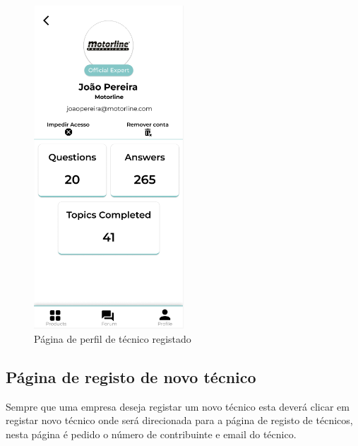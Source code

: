 \begin{figure}[htb]
    \centering
    \includegraphics[width=0.5\textwidth]{images/mockups/professional_profile.png}
    \caption{Página de perfil de técnico registado}
    \label{fig:32}
\end{figure}

\subsection{Página de registo de novo técnico}

Sempre que uma empresa deseja registar um novo técnico esta deverá clicar em registar novo técnico onde será
direcionada para a página de registo de técnicos, nesta página é pedido o número de contribuinte e email do 
técnico.

